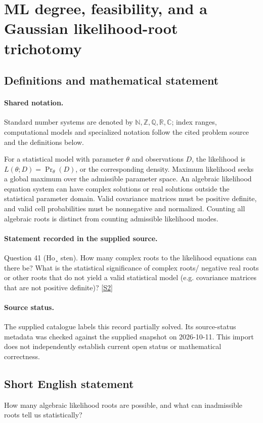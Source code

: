 \documentclass[11pt]{article}
\newcommand{\sref}[2]{\hyperlink{source:#1:#2}{[S#2]}}
\begin{document}
\section{ML degree, feasibility, and a Gaussian likelihood-root trichotomy}\label{statement}

\subsection{Definitions and mathematical statement}

\paragraph{Shared notation.}Standard number systems are denoted by $\mathbb N,\mathbb Z,\mathbb Q,\mathbb R,\mathbb C$; index ranges, computational models and specialized notation follow the cited problem source and the definitions below.


For a statistical model with parameter $\theta$ and observations $D$, the likelihood is $L(\theta;D)=\Pr_\theta(D)$, or the corresponding density. Maximum likelihood seeks a global maximum over the admissible parameter space. An algebraic likelihood equation system can have complex solutions or real solutions outside the statistical parameter domain. Valid covariance matrices must be positive definite, and valid cell probabilities must be nonnegative and normalized. Counting all algebraic roots is distinct from counting admissible likelihood modes.
\paragraph{Statement recorded in the supplied source.}
Question 41 (Ho¸ sten). How many complex roots to the likelihood equations can there be? What is the statistical significance of complex roots/ negative real roots or other roots that do not yield a valid statistical model (e.g. covariance matrices that are not positive definite)? \sref{statement}{2}
\paragraph{Source status.}
The supplied catalogue labels this record partially solved. Its source-status metadata was checked against the supplied snapshot on 2026-10-11. This import does not independently establish current open status or mathematical correctness.
\subsection{Short English statement}
How many algebraic likelihood roots are possible, and what can inadmissible roots tell us statistically?
\end{document}
